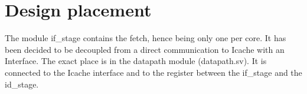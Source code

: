 \section{Design placement}
\label{chapter2}

The module if\_stage contains the fetch, hence being only one per core. It has been decided to be decoupled from a direct communication to Icache with an Interface. The exact place is in the datapath module (datapath.sv).  It is connected to the Icache interface and to the register between the if\_stage and the id\_stage.



